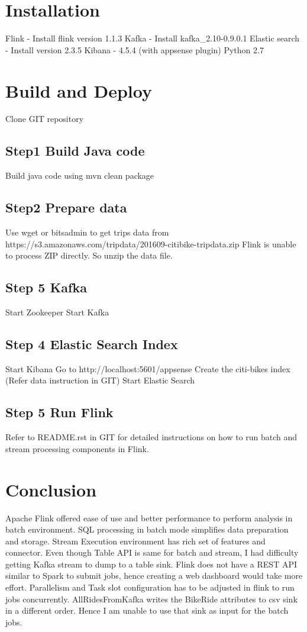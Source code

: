 \documentclass{sig-alternate-05-2015}
\begin{document}
\section {Installation}
Flink - Install flink version 1.1.3 \break
Kafka - Install kafka_2.10-0.9.0.1\break
Elastic search - Install version 2.3.5\break
Kibana - 4.5.4 (with appsense plugin)\break
Python 2.7\break

\section {Build and Deploy}

Clone GIT repository

\subsection {Step1 Build Java code}
Build java code using \break
mvn clean package

\subsection {Step2 Prepare data}
Use wget or bitsadmin to get trips data from \break
https://s3.amazonaws.com/tripdata/201609-citibike-tripdata.zip
\break
Flink is unable to process ZIP directly. So unzip the data file.

\subsection{Step 5 Kafka}
Start Zookeeper
Start Kafka

\subsection {Step 4 Elastic Search Index}
Start Kibana
Go to http://localhost:5601/appsense
Create the citi-bikes index (Refer data instruction in GIT)
Start Elastic Search


\subsection {Step 5 Run Flink}
Refer to README.rst in GIT for detailed instructions on how 
to run batch and stream processing components in Flink.
\break
\break

\section {Conclusion}
Apache Flink offered ease of use and better performance to perform analysis in batch environment. SQL processing in batch mode simplifies data preparation and storage.
\break
Stream Execution environment has rich set of features and connector. Even though Table API is same for batch and stream, I had difficulty getting Kafka stream to dump to a table sink.   
\break
Flink does not have a REST API similar to Spark to submit jobs, hence creating a web dashboard would take more effort.
\break
Parallelism and Task slot configuration has to be adjusted in flink to run jobs concurrently.
\break
AllRidesFromKafka writes the BikeRide attributes to csv sink in a different order. Hence I am unable to use that sink as input for the batch jobs.



 
\end{document}
